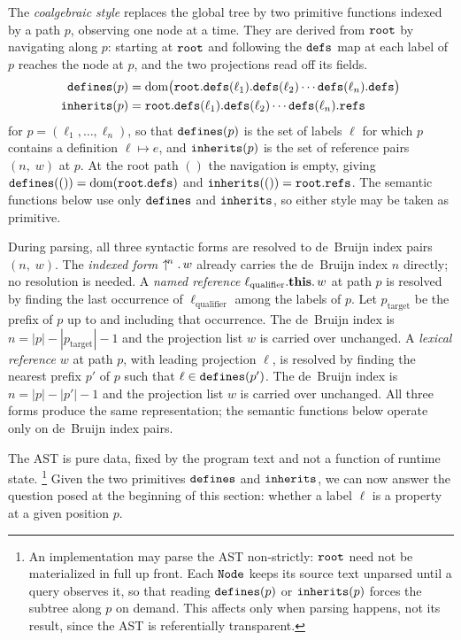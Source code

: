 The \emph{coalgebraic style} replaces the global tree by two
primitive functions indexed by a path $p$, observing one node at a
time. They are derived from $\mathtt{root}$ by navigating along $p$:
starting at $\mathtt{root}$ and following the $\mathtt{defs}$ map at each label
of $p$ reaches the node at $p$, and the two projections read off its
fields.
\begin{align}
  \mathtt{defines}(p) &= \operatorname{dom}\bigl(
    \mathtt{root}.\mathtt{defs}(\ell_1).\mathtt{defs}(\ell_2)\cdots\mathtt{defs}(\ell_n).\mathtt{defs}
  \bigr)
  \label{eq:defines}\\
  \mathtt{inherits}(p) &= \mathtt{root}.\mathtt{defs}(\ell_1).\mathtt{defs}(\ell_2)\cdots\mathtt{defs}(\ell_n).\mathtt{refs}
  \label{eq:inherits}
\end{align}
for $p = (\ell_1, \ldots, \ell_n)$, so that $\mathtt{defines}(p)$ is the set
of labels $\ell$ for which $p$ contains a definition $\ell \mapsto e$,
and $\mathtt{inherits}(p)$ is the set of reference pairs
$(n,\; w)$ at $p$.
At the root path $()$ the navigation is empty, giving
$\mathtt{defines}(()) = \operatorname{dom}(\mathtt{root}.\mathtt{defs})$ and
$\mathtt{inherits}(()) = \mathtt{root}.\mathtt{refs}$.
The semantic functions below use only $\mathtt{defines}$ and $\mathtt{inherits}$,
so either style may be taken as primitive.

During parsing, all three syntactic forms are resolved to
de~Bruijn index pairs $(n,\; w)$.
The \emph{indexed form} $\uparrow^{\!n}.\, w$
already carries the de~Bruijn index $n$ directly;
no resolution is needed.
A \emph{named reference} $\ell_{\mathrm{qualifier}}.\mathbf{this}.\, w$
at path $p$ is resolved by finding the last occurrence of
$\ell_{\mathrm{qualifier}}$ among the labels of $p$.
Let $p_{\mathrm{target}}$ be the prefix of $p$ up to and including
that occurrence.
The de~Bruijn index is $n = |p| - |p_{\mathrm{target}}| - 1$
and the projection list $w$ is carried over unchanged.
A \emph{lexical reference} $w$ at path $p$, with leading
projection $\ell$, is resolved by finding the nearest prefix $p'$ of $p$
such that $\ell \in \mathtt{defines}(p')$.
The de~Bruijn index is $n = |p| - |p'| - 1$ and the projection list
$w$ is carried over unchanged.
All three forms produce the same representation; the semantic functions
below operate only on de~Bruijn index pairs.

The AST is pure data, fixed by the program text and not a function
of runtime state.%
\footnote{
  An implementation may parse the AST non-strictly: $\mathtt{root}$ need
  not be materialized in full up front. Each $\mathtt{Node}$ keeps its source
  text unparsed until a query observes it, so that reading
  $\mathtt{defines}(p)$ or $\mathtt{inherits}(p)$ forces the subtree along $p$ on
  demand. This affects only when parsing happens, not its result,
  since the AST is referentially transparent.
}
Given the two primitives $\mathtt{defines}$ and $\mathtt{inherits}$, we can now answer
the question posed at the beginning of this section:
whether a label $\ell$ is a property at a given position $p$.

